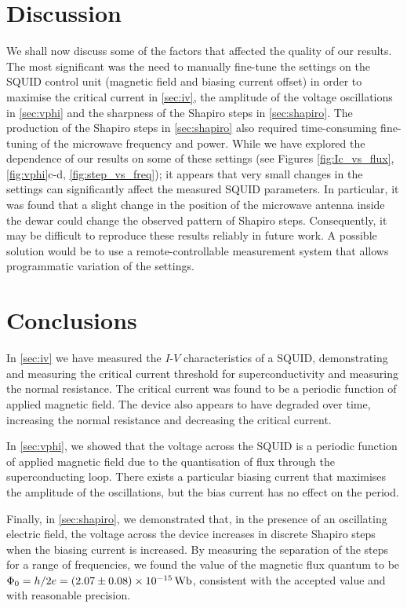 \documentclass[twocol]{ametsocV6.1}
\begin{document}
\newpage
\section{Discussion} \label{sec:discussion}
We shall now discuss some of the factors that affected the quality of our
results. The most significant was the need to manually fine-tune the settings
on the SQUID control unit (magnetic field and biasing current offset) in
order to maximise the critical current in \autoref{sec:iv}, the
amplitude of the voltage oscillations in \autoref{sec:vphi} and the sharpness
of the Shapiro steps in \autoref{sec:shapiro}. The production of the Shapiro
steps in \autoref{sec:shapiro} also required
time-consuming fine-tuning of the microwave frequency and power. While
we have explored the dependence of our results on some of these settings
(see Figures \ref{fig:Ic_vs_flux}, \ref{fig:vphi}c-d, \ref{fig:step_vs_freq});
it appears that very small changes in the settings can significantly affect
the measured SQUID parameters. In particular, it was found that a slight
change in the position of the microwave antenna inside the dewar could
change the observed pattern of Shapiro steps. Consequently, it may be difficult to reproduce
these results reliably in future work. A possible solution would be to use
a remote-controllable measurement system that allows programmatic variation
of the settings.


\section{Conclusions} \label{sec:conclusion}
In \autoref{sec:iv} we have measured the $I$-$V$ characteristics of a SQUID,
demonstrating and measuring the critical current threshold for superconductivity
and measuring the normal resistance. The critical current was found to be a
periodic function of applied magnetic field. The device also appears to have
degraded over time, increasing the normal resistance and decreasing the
critical current.

In \autoref{sec:vphi}, we showed that the voltage across the SQUID is a
periodic function of applied magnetic field due to the quantisation of flux
through the superconducting loop. There exists a particular biasing current
that maximises the amplitude of the oscillations, but the bias current has
no effect on the period.

Finally, in \autoref{sec:shapiro}, we demonstrated that, in the presence
of an oscillating electric field, the voltage across the device increases
in discrete Shapiro steps when the biasing current is increased. By measuring
the separation of the steps for a range of frequencies, we found the value
of the magnetic flux quantum to be
$\Phi_0 = h/2e = \SI{2.07 \pm 0.08 e-15}{\weber}$, consistent with the
accepted value and with reasonable precision.
\end{document}
